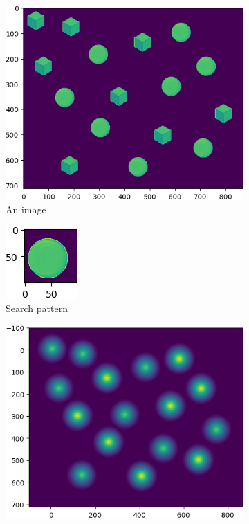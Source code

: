 \begin{figure}
	\centering
		\begin{subfigure}{.49\textwidth}
		\centering
		\includegraphics[width=\linewidth]{img/shapes}
		\caption{An image}
	\end{subfigure}
	\begin{subfigure}{.49\textwidth}
	\centering
	\includegraphics[width=0.4\linewidth]{img/shapes_pattern}
	\caption{Search pattern}
	\end{subfigure}
	\begin{subfigure}{.5\textwidth}
		\centering
		\includegraphics[width=\linewidth]{img/shapes_correlated}

\end{subfigure}
\end{figure}

